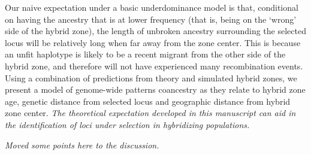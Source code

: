 \documentclass[12pt]{article}
\newcommand{\alisa}[1]{{\em \color{red} #1}}
\newcommand{\yb}[1]{{\em \color{magenta} #1}}
\begin{document}
Our naive expectation under a basic underdominance model is that, conditional on having the ancestry that is at lower frequency (that is, being on the `wrong' side of the hybrid zone), the length of unbroken ancestry surrounding the selected locus will be relatively long when far away from the zone center. 
This is because an unfit haplotype is likely to be a recent migrant from the other side of the hybrid zone, and therefore will not have experienced many recombination events. 
Using a combination of predictions from theory and simulated hybrid zones, we present a model of genome-wide patterns coancestry as they relate to hybrid zone age, genetic distance from selected locus and geographic distance from hybrid zone center.  
\yb{The theoretical expectation developed in this manuscript can aid in the identification of loci under selection in hybridizing populations.} 

\alisa{Moved some points here to the discussion.}




\end{document}
